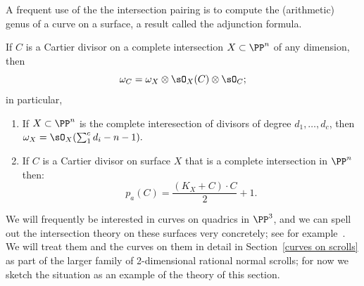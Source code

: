 A frequent use of the the intersection pairing is to compute the (arithmetic) genus of a curve on a surface,
a result called the adjunction formula.

\begin{theorem}\label{adjunction formula} \cite[Theorem ****]{Hartshorne1977}
If $C$ is a Cartier divisor  on a complete intersection $X\subset \PP^n$ of any dimension, then 
$$
\omega_C = \omega_X \otimes \sO_X(C) \otimes \sO_C;
$$
in particular, 
\begin{enumerate}
 \item If $X\subset \PP^n$ is the complete interesection of divisors of degree $d_1, \dots, d_c$, then
 $\omega_X = \sO_X( \sum_1^c d_i -n-1).$
 \item If $C$ is a Cartier divisor on surface $X$ that is a complete intersection
in $\PP^n$ then: \label{genus formula}
$$
p_a(C) = \frac{(K_X+C)\cdot C}{2} +1.
 $$
\end{enumerate}
\end{theorem}

We will frequently be interested in curves on quadrics in $\PP^3$, and we can spell out the
intersection theory on these surfaces very concretely; see for example~\cite[Section V.1]{H}.
We will treat them and the curves on them in detail in Section~\ref{curves on scrolls} as part of the larger family of 2-dimensional rational normal scrolls; for
now we sketch the situation as an example of the theory of this section. 

